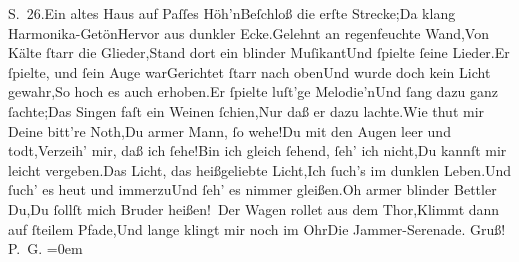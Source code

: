 \begin{ledgroupsized}[t]{13cm}
{{{                           S. 26.}}}\label{K_L02928-1h}\stanzaend{}\stanza{}Ein altes Haus auf Paſſes Höh’n\newverse{}Beſchloß die erſte Strecke;\newverse{}Da klang Harmonika-Getön\newverse{}Hervor aus dunkler Ecke.\stanzaend{}\stanza{}Gelehnt an regenfeuchte Wand,\newverse{}Von Kälte ſtarr die Glieder,\newverse{}Stand dort ein blinder Muſikant\newverse{}Und ſpielte ſeine Lieder.\stanzaend{}\stanza{}Er ſpielte, und ſein Auge war\newverse{}Gerichtet ſtarr nach oben\newverse{}Und wurde doch kein Licht gewahr,\newverse{}So hoch es auch erhoben.\stanzaend{}\stanza{}{\pb}Er ſpielte luſt’ge Melodie’n\newverse{}Und ſang dazu ganz ſachte;\newverse{}Das Singen faſt ein Weinen ſchien,\newverse{}Nur daß er dazu lachte.\stanzaend{}\stanza{}Wie thut mir Deine bitt’re Noth,\newverse{}Du armer Mann, ſo wehe!\newverse{}Du mit den Augen leer und todt,\newverse{}Verzeih’ mir, daß ich ſehe!\stanzaend{}\stanza{}Bin ich gleich ſehend, ſeh’ ich  nicht,\newverse{}Du kannſt mir leicht vergeben.\newverse{}Das Licht, das heißgeliebte Licht,\newverse{}Ich ſuch’s im dunklen Leben.\stanzaend{}\stanza{}Und ſuch’ es heut und immerzu\newverse{}Und ſeh’ es nimmer gleißen.\newverse{}Oh armer blinder Bettler Du,\newverse{}Du ſollſt mich Bruder heißen! {\dotssix}\stanzaend{}\stanza{}Der Wagen rollet aus dem Thor,\newverse{}Klimmt dann auf ſteilem Pfade,\newverse{}Und lange klingt mir noch im Ohr\newverse{}Die Jammer-Serenade.\stanzaend{}\pstart
           Gruß! {\\[\baselineskip]}\spacefill\mbox{P. G.}\pend
           \leftskip=0em{}
         
         \endnumbering{}\end{ledgroupsized}  \newcommand{\dateiname}{L02928}\newcommand{\titel}{Paul Goldmann an Arthur Schnitzler, 28. 8. [1900]}\newcommand{\editorInnen}{Martin Anton Müller und Laura Untner}
      